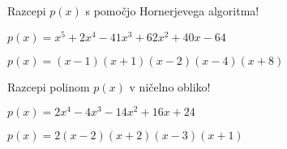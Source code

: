 \begin{vaja}
  Razcepi $p(x)$ s pomočjo Hornerjevega algoritma!

$p(x)=x^5+2x^4-41x^3+62x^2+40x-64$

  \begin{odgovor}
    $p(x)=(x-1)(x+1)(x-2)(x-4)(x+8)$
  \end{odgovor}
\end{vaja}

\begin{vaja}
  Razcepi polinom $p(x)$ v ničelno obliko!

$p(x)=2x^4-4x^3-14x^2+16x+24$


  \begin{odgovor}
    $p(x)=2(x-2)(x+2)(x-3)(x+1)$
  \end{odgovor}
\end{vaja}

